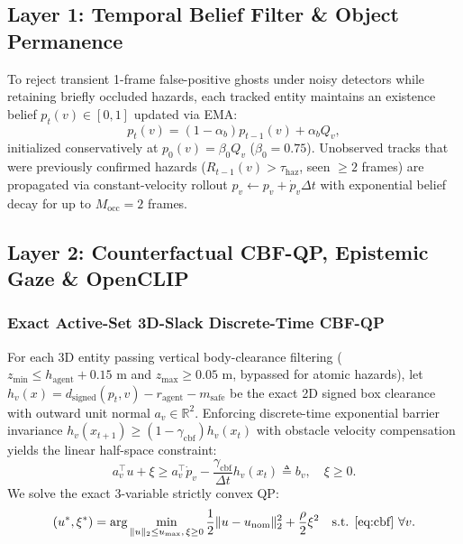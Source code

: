 \documentclass[journal]{IEEEtran}
\begin{document}
\subsection{Layer 1: Temporal Belief Filter \& Object Permanence}
To reject transient 1-frame false-positive ghosts under noisy detectors while retaining briefly occluded hazards, each tracked entity maintains an existence belief $p_t(v) \in [0, 1]$ updated via EMA:
\begin{equation}
    p_t(v) = (1 - \alpha_b) p_{t-1}(v) + \alpha_b Q_v,
\end{equation}
initialized conservatively at $p_0(v) = \beta_0 Q_v$ ($\beta_0 = 0.75$). Unobserved tracks that were previously confirmed hazards ($R_{t-1}(v) > \tau_{\text{haz}}$, seen $\ge 2$ frames) are propagated via constant-velocity rollout $p_v \leftarrow p_v + \dot{p}_v \Delta t$ with exponential belief decay for up to $M_{\text{occ}} = 2$ frames.

\subsection{Layer 2: Counterfactual CBF-QP, Epistemic Gaze \& OpenCLIP}
\subsubsection{Exact Active-Set 3D-Slack Discrete-Time CBF-QP}
For each 3D entity passing vertical body-clearance filtering ($z_{\min} \le h_{\text{agent}} + 0.15\text{ m}$ and $z_{\max} \ge 0.05\text{ m}$, bypassed for atomic hazards), let $h_v(x) = d_{\text{signed}}(p_t, v) - r_{\text{agent}} - m_{\text{safe}}$ be the exact 2D signed box clearance with outward unit normal $a_v \in \mathbb{R}^2$. Enforcing discrete-time exponential barrier invariance $h_v(x_{t+1}) \ge (1 - \gamma_{\text{cbf}}) h_v(x_t)$ with obstacle velocity compensation yields the linear half-space constraint:
\begin{equation}
    a_v^\top u + \xi \ge a_v^\top \dot{p}_v - \frac{\gamma_{\text{cbf}}}{\Delta t} h_v(x_t) \triangleq b_v, \quad \xi \ge 0.
    \label{eq:cbf}
\end{equation}
We solve the exact 3-variable strictly convex QP:
\begin{equation}
    (u^*, \xi^*) = \arg\min_{\|u\|_2 \le u_{\max},\, \xi \ge 0} \frac{1}{2}\|u - u_{\text{nom}}\|_2^2 + \frac{\rho}{2}\xi^2 \quad \text{s.t. } \eqref{eq:cbf}\ \forall v.
    \label{eq:qp}
\end{equation}
\end{document}
